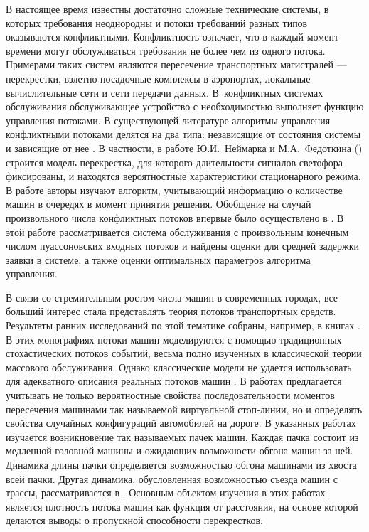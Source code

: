 \documentclass{report}
\begin{document}
В настоящее время известны достаточно сложные технические системы, в которых требования неоднородны и потоки требований разных типов оказываются конфликтными. Конфликтность означает, что в каждый момент времени могут обслуживаться требования не более чем из одного потока. Примерами таких систем являются пересечение транспортных магистралей --- перекрестки, взлетно-посадочные комплексы в аэропортах, локальные вычислительные сети и сети передачи данных. В~конфликтных системах обслуживания обслуживающее устройство с необходимостью выполняет функцию управления потоками. В существующей литературе алгоритмы управления конфликтными потоками делятся на два типа: независящие от состояния системы \cite{Darroch:1964,Neymark:Fedotkin:1967} и зависящие от нее \cite{Neymark:Fedotkin:1968, Fedotkin:1976, Ferguson:1985, Takagi:1985}. В частности, в работе Ю.И.~Неймарка и М.А.~Федоткина (\cite{Neymark:Fedotkin:1967}) строится модель перекрестка, для которого длительности сигналов светофора фиксированы, и находятся вероятностные характеристики стационарного режима. В работе \cite{Neymark:Fedotkin:1968} авторы изучают алгоритм, учитывающий информацию о количестве машин в очередях в момент принятия решения. Обобщение на случай произвольного числа конфликтных потоков впервые было осуществлено в \cite{Yakushev:1990}. В этой работе рассматривается система обслуживания с произвольным конечным числом пуассоновских входных потоков и найдены оценки для средней задержки заявки в системе, а также оценки оптимальных параметров алгоритма управления. 

В связи со стремительным ростом числа машин в современных городах, все больший интерес стала представлять теория потоков транспортных средств. Результаты ранних исследований по этой тематике собраны, например, в книгах \cite{Haight:1963, Drew:1968, Inose:1975}. В этих монографиях потоки машин моделируются с помощью традиционных стохастических потоков событий, весьма полно изученных в классической теории массового обслуживания. Однако классические модели не удается использовать для адекватного описания реальных потоков машин \cite{Bartlet:1963}. В работах
\cite{Fedotkin:2009,Fedotkin:Kudryavcev:Rachinskaya:2010, Rachinskaya:Fedotkin:2011:1,Rachinskaya:Fedotkin:2011:2, Fedotkin:Kudryavcev:Rachinskaya:2011, Rachinskaya:Fedotkin:2012, Rachinskaya:Fedotkin:2013, Rachinskaya:Fedotkin:2014} предлагается учитывать не только вероятностные свойства последовательности моментов пересечения машинами так называемой виртуальной стоп-линии, но и определять свойства случайных конфигураций автомобилей на дороге. В указанных работах изучается возникновение так называемых пачек машин. Каждая пачка состоит из медленной головной машины и ожидающих возможности обгона машин за ней. Динамика длины пачки определяется возможностью обгона машинами из хвоста всей пачки. Другая динамика, обусловленная возможностью съезда машин с трассы, рассматривается в \cite{Afanasyeva:Bulinskaya:2013:1,Afanasyeva:Bulinskaya:2010,Afanasyeva:Bulinskaya:2013:2}. Основным объектом изучения в этих работах является плотность потока машин как функция от расстояния, на основе которой делаются выводы о пропускной способности перекрестков.
\end{document}

